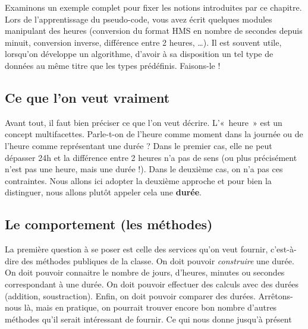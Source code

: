 	Examinons un exemple complet pour fixer les notions introduites par ce
	chapitre. Lors de l'apprentissage du pseudo-code, vous
	avez écrit quelques modules manipulant des heures (conversion du format
	HMS en nombre de secondes depuis minuit, conversion inverse, différence
	entre 2 heures, …). Il est souvent utile, lorsqu’on développe un
	algorithme, d’avoir à sa disposition un tel type de données au même
	titre que les types prédéfinis. Faisons-le !
	
	\subsection{Ce que l’on veut vraiment}
	
		Avant tout, il faut bien préciser ce que l’on veut décrire. L’«~heure~»
		est un concept multifacettes. Parle-t-on de l’heure comme moment dans
		la journée ou de l’heure comme représentant une durée ? Dans le premier
		cas, elle ne peut dépasser 24h et la différence entre 2 heures n’a pas
		de sens (ou plus précisément n’est pas une heure, mais une durée !).
		Dans le deuxième cas, on n’a pas ces contraintes. Nous allons ici
		adopter la deuxième approche et pour bien la distinguer, nous allons
		plutôt appeler cela une \textbf{durée}.
	
	\subsection{Le comportement (les méthodes)}
	
		La première question à se poser est celle des services qu’on veut
		fournir, c’est-à-dire des méthodes publiques de la classe. On doit
		pouvoir \textit{construire} une durée. On doit pouvoir connaitre le
		nombre de jours, d’heures, minutes ou secondes correspondant à une durée. On doit
		pouvoir effectuer des calculs avec des durées (addition, soustraction).
		Enfin, on doit pouvoir comparer des durées. Arrêtons-nous là, mais en
		pratique, on pourrait trouver encore bon nombre d’autres méthodes qu’il
		serait intéressant de fournir. Ce qui nous donne jusqu’à présent
		
		
